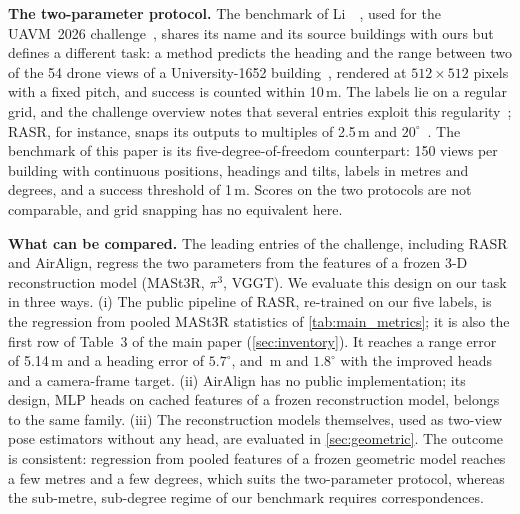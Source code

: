 \noindent\textbf{The two-parameter protocol.} The benchmark of Li~\etal~\cite{li2026lastmeter}, used for the UAVM~2026 challenge~\cite{deuser2026uavm}, shares its name and its source buildings with ours but defines a different task: a method predicts the heading and the range between two of the 54 drone views of a University-1652 building~\cite{zheng2020university}, rendered at $512{\times}512$ pixels with a fixed pitch, and success is counted within 10\,m. The labels lie on a regular grid, and the challenge overview notes that several entries exploit this regularity~\cite{deuser2026uavm}; RASR, for instance, snaps its outputs to multiples of 2.5\,m and $20^\circ$~\cite{liang2026rasr}. The benchmark of this paper is its five-degree-of-freedom counterpart: 150 views per building with continuous positions, headings and tilts, labels in metres and degrees, and a success threshold of 1\,m. Scores on the two protocols are not comparable, and grid snapping has no equivalent here.

\noindent\textbf{What can be compared.} The leading entries of the challenge, including RASR and AirAlign, regress the two parameters from the features of a frozen 3-D reconstruction model (MASt3R, $\pi^3$, VGGT). We evaluate this design on our task in three ways. (i) The public pipeline of RASR, re-trained on our five labels, is the regression from pooled MASt3R statistics of \cref{tab:main_metrics}; it is also the first row of Table~3 of the main paper (\cref{sec:inventory}). It reaches a range error of 5.14\,m and a heading error of $5.7^\circ$, and \mlpCamD\,m and $1.8^\circ$ with the improved heads and a camera-frame target. (ii) AirAlign has no public implementation; its design, MLP heads on cached features of a frozen reconstruction model, belongs to the same family. (iii) The reconstruction models themselves, used as two-view pose estimators without any head, are evaluated in \cref{sec:geometric}. The outcome is consistent: regression from pooled features of a frozen geometric model reaches a few metres and a few degrees, which suits the two-parameter protocol, whereas the sub-metre, sub-degree regime of our benchmark requires correspondences.

